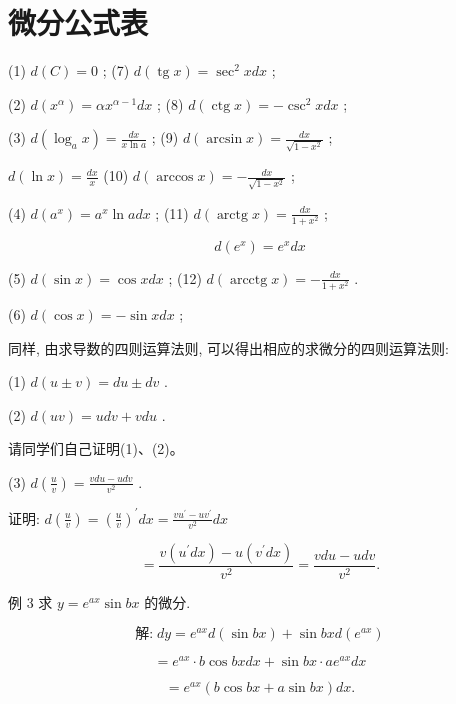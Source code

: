\documentclass[lang=cn,newtx,12pt,scheme=chinese]{elegantbook}
\begin{document}
\section*{微分公式表}

(1) \(d\left( C\right) = 0\) ; (7) \(d\left( {\operatorname{tg}x}\right) = {\sec }^{2}{xdx}\) ;

(2) \(d\left( {x}^{\alpha }\right) = \alpha {x}^{\alpha - 1}{dx}\) ; (8) \(d\left( {\operatorname{ctg}x}\right) = - {\csc }^{2}{xdx}\) ;

(3) \(d\left( {{\log }_{a}x}\right) = \frac{dx}{x\ln a}\) ; (9) \(d\left( {\arcsin x}\right) = \frac{dx}{\sqrt{1 - {x}^{2}}}\) ;

\(d\left( {\ln x}\right) = \frac{dx}{x}\) (10) \(d\left( {\arccos x}\right) = - \frac{dx}{\sqrt{1 - {x}^{2}}}\) ;

(4) \(d\left( {a}^{x}\right) = {a}^{x}\ln {adx}\) ; (11) \(d\left( {\operatorname{arctg}x}\right) = \frac{dx}{1 + {x}^{2}}\) ;

\[
d\left( {e}^{x}\right) = {e}^{x}{dx}
\]

(5) \(d\left( {\sin x}\right) = \cos {xdx}\) ; (12) \(d\left( {\operatorname{arcctg}x}\right) = - \frac{dx}{1 + {x}^{2}}\) .

(6) \(d\left( {\cos x}\right) = - \sin {xdx}\) ;

同样, 由求导数的四则运算法则, 可以得出相应的求微分的四则运算法则:

(1) \(d\left( {u \pm v}\right) = {du} \pm {dv}\) .

(2) \(d\left( {uv}\right) = {udv} + {vdu}\) .

请同学们自己证明(1)、(2)。

(3) \(d\left( \frac{u}{v}\right) = \frac{{vdu} - {udv}}{{v}^{2}}\) .

证明: \(d\left( \frac{u}{v}\right) = {\left( \frac{u}{v}\right) }^{\prime }{dx} = \frac{v{u}^{\prime } - u{v}^{\prime }}{{v}^{2}}{dx}\)

\[
= \frac{v\left( {{u}^{\prime }{dx}}\right) - u\left( {{v}^{\prime }{dx}}\right) }{{v}^{2}} = \frac{{vdu} - {udv}}{{v}^{2}}.
\]

例 3 求 \(y = {e}^{ax}\sin {bx}\) 的微分.

\[
\text{解:}\;{dy} = {e}^{ax}d\left( {\sin {bx}}\right) + \sin {bxd}\left( {e}^{ax}\right)
\]

\[
= {e}^{ax} \cdot b\cos {bxdx} + \sin {bx} \cdot a{e}^{ax}{dx}
\]

\[
= {e}^{ax}\left( {b\cos {bx} + a\sin {bx}}\right) {dx}\text{.}
\]
\end{document}
